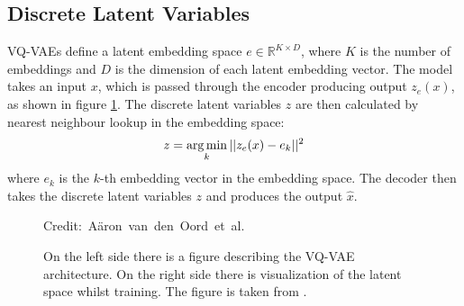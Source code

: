 \subsection {Discrete Latent Variables}

VQ-VAEs define a latent embedding space $ e \in \mathbb{R}^{K \times D} $, where $K$ is the number of embeddings and $D$ is the dimension of each latent embedding vector. The model takes an input $x$, which is passed through the encoder producing output $z_e(x)$, as shown in figure \ref{VQVAEFigure}. 
The discrete latent variables $z$ are then calculated by nearest neighbour lookup in the embedding space: \[ z = \operatorname*{arg\,min}_{k} || z_e(x) - e_k ||^2 \] where $e_k$ is the $k$-th embedding vector in the embedding space. The decoder then takes the discrete latent variables $z$ and produces the output $\hat{x}$.

\begin{figure}[H]
    \centering

    \caption{On the left side there is a figure describing the VQ-VAE architecture. On the right side there is visualization of the latent space whilst training. The figure is taken from \cite{vqvae}.}
  	\medskip 
	\hspace*{15pt}\hbox{\scriptsize Credit: Aäron van den Oord et al.}
    \label{VQVAEFigure}
\end{figure}


